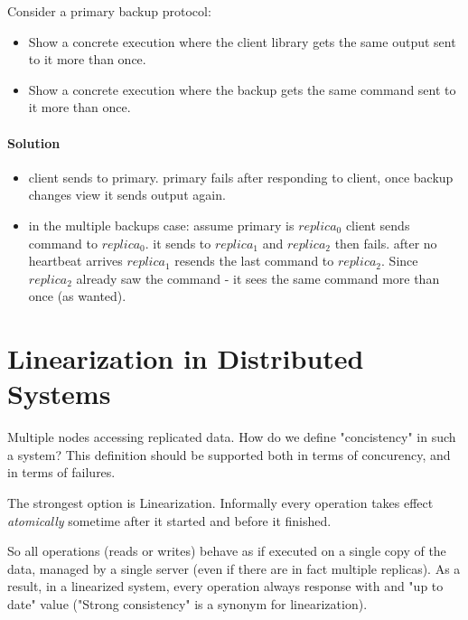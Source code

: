 
\begin{xca}[Quiz 1.J]
    Consider a primary backup protocol:
    \begin{itemize} 
        \item Show a concrete execution where the client library gets the same output sent to it more than once.
        \item Show a concrete execution where the backup gets the same command sent to it more than once.
    \end{itemize}

    \paragraph{Solution}
    \begin{itemize}
        \item client sends to primary. primary fails after responding to client, once backup changes view it sends output again.
        \item in the multiple backups case: assume primary is $replica_0$
         client sends command to $replica_0$. 
         it sends to $replica_1$ and $replica_2$ then fails.
         after no heartbeat arrives $replica_1$ resends the last command to $replica_2$. 
         Since $replica_2$ already saw the command - it sees the same command more than once (as wanted).
    \end{itemize}
\end{xca}

\section{Linearization in Distributed Systems}
Multiple nodes accessing replicated data.
How do we define "concistency" in such a system?
This definition should be supported both in terms of concurency, and in terms of failures.

The strongest option is Linearization.
Informally every operation takes effect \emph{atomically}
sometime after it started and before it finished.

So all operations (reads or writes) behave as if executed on a single copy of
the data, managed by a single server (even if there are in fact multiple replicas).
As a result, in a linearized system, every operation always response 
with and "up to date" value ("Strong consistency" is a synonym for linearization).

